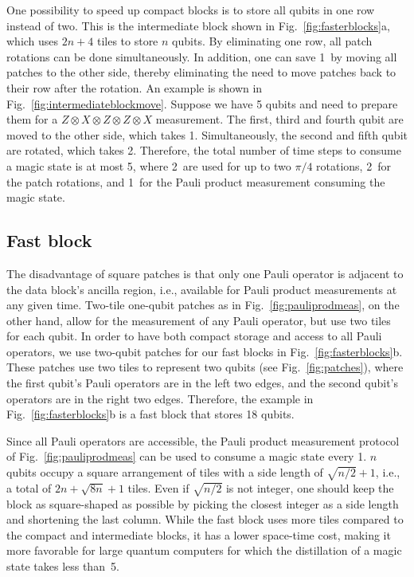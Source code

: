 \documentclass[prx,aps,letterpaper,twocolumn,allowfontchageintitle=true,accepted=2019-02-01]{quantumarticle}
\begin{document}
One possibility to speed up compact blocks is to store all qubits in one row instead of two. This is the intermediate block shown in Fig.~\ref{fig:fasterblocks}a, which uses $2n+4$ tiles to store $n$ qubits. By eliminating one row, all patch rotations can be done simultaneously. In addition, one can save 1\clock \ by moving all patches to the other side, thereby eliminating the need to move patches back to their row after the rotation. An example is shown in Fig.~\ref{fig:intermediateblockmove}. Suppose we have 5 qubits and need to prepare them for a $Z \otimes X \otimes Z \otimes Z \otimes X$ measurement. The first, third and fourth qubit are moved to the other side, which takes 1\clock. Simultaneously, the second and fifth qubit are rotated, which takes 2\clock. Therefore, the total number of time steps to consume a magic state is at most 5\clock, where 2\clock \ are used for up to two $\pi/4$ rotations, 2\clock \ for the patch rotations, and 1\clock \ for the Pauli product measurement consuming the magic state.

\subsection{Fast block}

The disadvantage of square patches is that only one Pauli operator is adjacent to the data block's ancilla region, i.e., available for Pauli product measurements at any given time. Two-tile one-qubit patches as in Fig.~\ref{fig:pauliprodmeas}, on the other hand, allow for the measurement of any Pauli operator, but use two tiles for each qubit. In order to have both compact storage and access to all Pauli operators, we use two-qubit patches for our fast blocks in Fig.~\ref{fig:fasterblocks}b. These patches use two tiles to represent two qubits (see Fig.~\ref{fig:patches}), where the first qubit's Pauli operators are in the left two edges, and the second qubit's operators are in the right two edges. Therefore, the example in Fig.~\ref{fig:fasterblocks}b is a fast block that stores 18 qubits.


Since all Pauli operators are accessible, the Pauli product measurement protocol of Fig.~\ref{fig:pauliprodmeas} can be used to consume a magic state every 1\clock. $n$ qubits occupy a square arrangement of tiles with a side length of $\sqrt{n/2}+1$, i.e., a total of $2n+\sqrt{8n}+1$ tiles. Even if $\sqrt{n/2}$ is not integer, one should keep the block as square-shaped as possible by picking the closest integer as a side length and shortening the last column.
While the fast block uses more tiles compared to the compact and intermediate blocks, it has a lower space-time cost, making it more favorable for large quantum computers for which the distillation of a magic state takes less than~5\clock.
\end{document}
